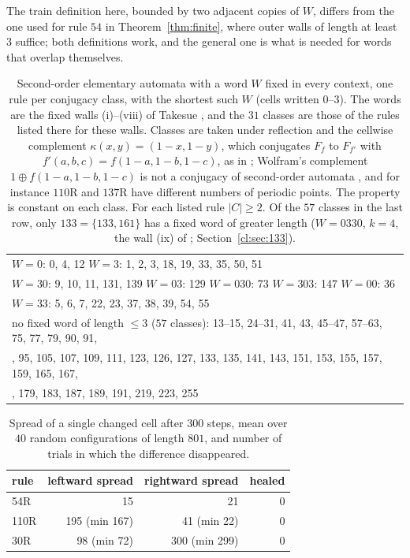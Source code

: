 The train definition here, bounded by two adjacent copies of $W$, differs from the one used for rule $54$ in Theorem~\ref{thm:finite}, where outer walls of length at least $3$ suffice; both definitions work, and the general one is what is needed for words that overlap themselves.

\begin{table}[t]
\caption{Second-order elementary automata with a word $W$ fixed in every context, one rule per conjugacy class, with the shortest such $W$ (cells written $0$--$3$). The words are the fixed walls (i)--(viii) of Takesue \cite[Fig.~2, Table~III]{Takesue1989}, and the $31$ classes are those of the rules listed there for these walls. Classes are taken under reflection and the cellwise complement $\kappa(x,y)=(1-x,1-y)$, which conjugates $F_f$ to $F_{f'}$ with $f'(a,b,c)=f(1-a,1-b,1-c)$, as in \cite[Table~I]{Takesue1989}; Wolfram's complement $1\oplus f(1-a,1-b,1-c)$ is not a conjugacy of second-order automata \cite[p.~377]{Takesue1989}, and for instance $110$R and $137$R have different numbers of periodic points. The property is constant on each class. For each listed rule $|C|\ge2$. Of the $57$ classes in the last row, only $133=\{133,161\}$ has a fixed word of greater length ($W=0330$, $k=4$, the wall (ix) of \cite{Takesue1989}; Section~\ref{cl:sec:133}).}
\label{tab:walls}
\centering\small
\begin{tabular}{l}
\toprule
$W=0$: 0, 4, 12 \qquad $W=3$: 1, 2, 3, 18, 19, 33, 35, 50, 51\\
$W=30$: 9, 10, 11, 131, 139 \qquad $W=03$: 129 \qquad $W=030$: 73 \qquad $W=303$: 147 \qquad $W=00$: 36\\
$W=33$: 5, 6, 7, 22, 23, 37, 38, 39, 54, 55\\
\midrule
no fixed word of length $\le3$ ($57$ classes): 13--15, 24--31, 41, 43, 45--47, 57--63, 75, 77, 79, 90, 91,\\
\quad 94, 95, 105, 107, 109, 111, 123, 126, 127, 133, 135, 141, 143, 151, 153, 155, 157, 159, 165, 167,\\
\quad 175, 179, 183, 187, 189, 191, 219, 223, 255\\
\bottomrule
\end{tabular}
\end{table}

\begin{table}[t]
\caption{Spread of a single changed cell after $300$ steps, mean over $40$ random configurations of length $801$, and number of trials in which the difference disappeared.}
\label{tab:spread}
\centering
\begin{tabular}{lrrr}
\toprule
rule & leftward spread & rightward spread & healed\\
\midrule
54R & 15 & 21 & 0\\
110R & 195 (min 167) & 41 (min 22) & 0\\
30R & 98 (min 72) & 300 (min 299) & 0\\
\bottomrule
\end{tabular}
\end{table}



